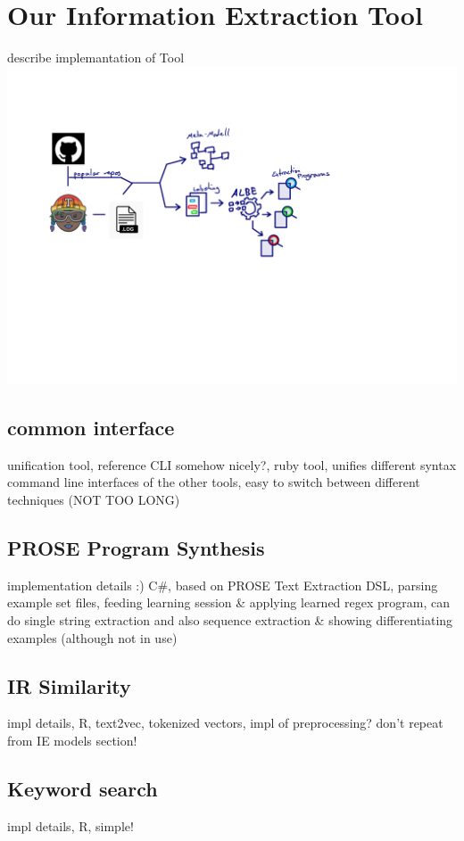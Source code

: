 \documentclass[\myrootdir/main.tex]{subfiles}
\begin{document}
\chapter{Our Information Extraction Tool}
\label{implementation}
describe implemantation of Tool
\includegraphics[page=7, width=\textwidth, trim={0.5cm 0.5cm 0.5cm 0.5cm}, clip]{img/flow-of-research.pdf}

\section{common interface} 
unification tool, reference CLI somehow nicely?,
ruby tool, unifies different syntax command line interfaces of the other tools, easy to switch between different techniques (NOT TOO LONG)

\section{PROSE Program Synthesis}
implementation details :)
C\#, based on PROSE Text Extraction DSL, parsing example set files, feeding learning session \& applying learned regex program, can do single string extraction and also sequence extraction \& showing differentiating examples (although not in use)

\section{IR Similarity}
impl details,
R, text2vec, tokenized vectors, impl of preprocessing?
don't repeat from IE models section!

\section{Keyword search}
impl details,
R, simple!
\end{document}
